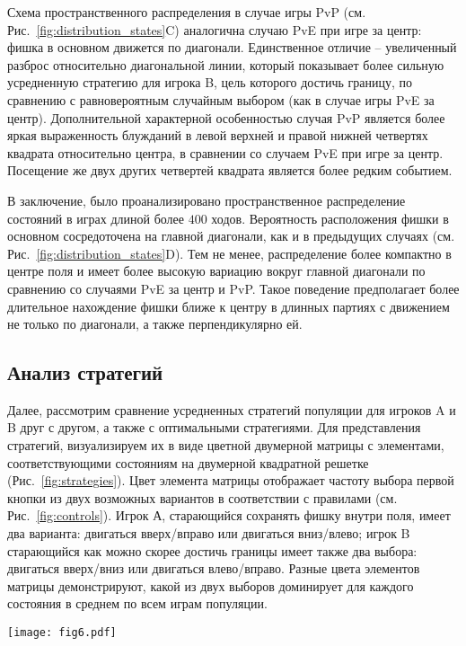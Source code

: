 Схема пространственного распределения в случае игры PvP (см. Рис.~\cref{fig:distribution_states}C) аналогична случаю PvE при игре за центр: фишка в основном движется по диагонали. Единственное отличие -- увеличенный разброс относительно диагональной линии, который показывает более сильную усредненную стратегию для игрока B, цель которого достичь границу, по сравнению с равновероятным случайным выбором (как в случае игры PvE за центр). Дополнительной характерной особенностью случая PvP является более яркая выраженность блужданий в левой верхней и правой нижней четвертях квадрата относительно центра, в сравнении со случаем PvE при игре за центр. Посещение же двух других четвертей квадрата является более редким событием.

В заключение, было проанализировано пространственное распределение состояний в играх длиной более $400$ ходов. Вероятность расположения фишки в основном сосредоточена на главной диагонали, как и в предыдущих случаях (см. Рис.~\cref{fig:distribution_states}D). Тем не менее, распределение более компактно в центре поля и имеет более высокую вариацию вокруг главной диагонали по сравнению со случаями PvE за центр и PvP. Такое поведение предполагает более длительное нахождение фишки ближе к центру в длинных партиях с движением не только по диагонали, а также перпендикулярно ей.

\subsection{Анализ стратегий}\label{subsec:ch3/sec4/sub5}

Далее, рассмотрим сравнение усредненных стратегий популяции для игроков A и B друг с другом, а также с оптимальными стратегиями. Для представления стратегий, визуализируем их в виде цветной двумерной матрицы с элементами, соответствующими состояниям на двумерной квадратной решетке (Рис.~\cref{fig:strategies}). Цвет элемента матрицы отображает частоту выбора первой кнопки из двух возможных вариантов в соответствии с правилами (см. Рис.~\cref{fig:controls}). Игрок А, старающийся сохранять фишку внутри поля, имеет два варианта: двигаться вверх/вправо или двигаться вниз/влево; игрок B старающийся как можно скорее достичь границы имеет также два выбора: двигаться вверх/вниз или двигаться влево/вправо. Разные цвета элементов матрицы демонстрируют, какой из двух выборов доминирует для каждого состояния в среднем по всем играм популяции.

\begin{figure*}[t]
    \centering
    \texttt{[image: fig6.pdf]}
    \caption{
        Визуализация средних популяционных стратегий для разных режимов, полученных в эксперименте. Цвет ячеек отображает частоту выбора первой чистой стратегии: для игры за центр (A, B, C) и для игры за границу (D, E, F).
    }  
    \label{fig:strategies}
    
\end{figure*}

